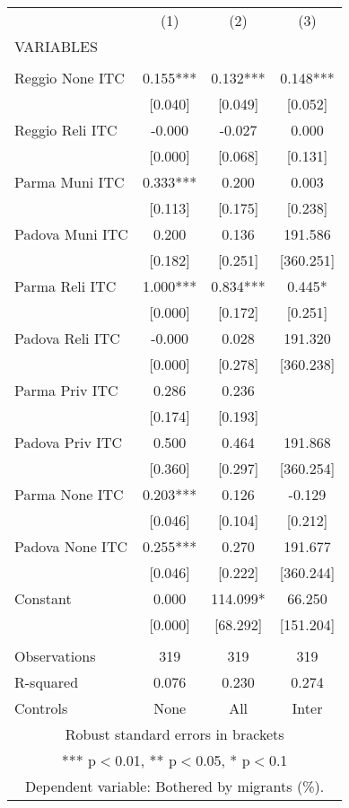 \begin{tabular}{lccc} \hline
 & (1) & (2) & (3) \\
VARIABLES &  &  &  \\ \hline
 &  &  &  \\
Reggio None ITC & 0.155*** & 0.132*** & 0.148*** \\
 & [0.040] & [0.049] & [0.052] \\
Reggio Reli ITC & -0.000 & -0.027 & 0.000 \\
 & [0.000] & [0.068] & [0.131] \\
Parma Muni ITC & 0.333*** & 0.200 & 0.003 \\
 & [0.113] & [0.175] & [0.238] \\
Padova Muni ITC & 0.200 & 0.136 & 191.586 \\
 & [0.182] & [0.251] & [360.251] \\
Parma Reli ITC & 1.000*** & 0.834*** & 0.445* \\
 & [0.000] & [0.172] & [0.251] \\
Padova Reli ITC & -0.000 & 0.028 & 191.320 \\
 & [0.000] & [0.278] & [360.238] \\
Parma Priv ITC & 0.286 & 0.236 &  \\
 & [0.174] & [0.193] &  \\
Padova Priv ITC & 0.500 & 0.464 & 191.868 \\
 & [0.360] & [0.297] & [360.254] \\
Parma None ITC & 0.203*** & 0.126 & -0.129 \\
 & [0.046] & [0.104] & [0.212] \\
Padova None ITC & 0.255*** & 0.270 & 191.677 \\
 & [0.046] & [0.222] & [360.244] \\
Constant & 0.000 & 114.099* & 66.250 \\
 & [0.000] & [68.292] & [151.204] \\
 &  &  &  \\
Observations & 319 & 319 & 319 \\
R-squared & 0.076 & 0.230 & 0.274 \\
 Controls & None & All & Inter \\ \hline
\multicolumn{4}{c}{ Robust standard errors in brackets} \\
\multicolumn{4}{c}{ *** p$<$0.01, ** p$<$0.05, * p$<$0.1} \\
\multicolumn{4}{c}{ Dependent variable: Bothered by migrants (\%).} \\
\end{tabular}
